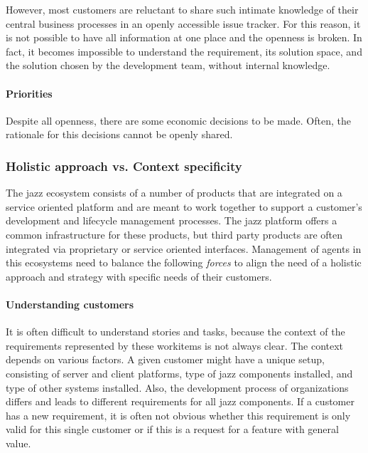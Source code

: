 However, most customers are reluctant to share such intimate knowledge of their central business processes in an openly accessible issue tracker.
For this reason, it is not possible to have all information at one place and the openness is broken.
In fact, it becomes impossible to understand the requirement, its solution space, and the solution chosen by the development team, without internal knowledge.

\paragraph{Priorities} 
Despite all openness, there are some economic decisions to be made.
Often, the rationale for this decisions cannot be openly shared. 

\subsubsection{Holistic approach vs. Context specificity}
The jazz ecosystem consists of a number of products that are integrated on a service oriented platform and are meant to work together to support a customer's development and lifecycle management processes.
The jazz platform offers a common infrastructure for these products, but third party products are often integrated via proprietary or service oriented interfaces. 
Management of agents in this ecosystems need to balance the following \emph{forces} to align the need of a holistic approach and strategy with specific needs of their customers.

\paragraph{Understanding customers} It is often difficult to understand stories and tasks, because the context of the requirements represented by these workitems is not always clear. 
The context depends on various factors. 
A given customer might have a unique setup, consisting of server and client platforms, type of jazz components installed, and type of other systems installed.
Also, the development process of organizations differs and leads to different requirements for all jazz components.
If a customer has a new requirement, it is often not obvious whether this requirement is only valid for this single customer or if this is a request for a feature with general value.

